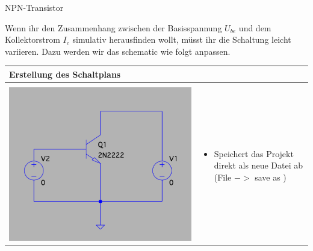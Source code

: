 \begin{frame}[t]{NPN-Transistor}

  \begin{spacing}{0.6} \begin{tiny}

      Wenn ihr den Zusammenhang zwischen der Basisspannung $U_{be}$ und dem Kollektorstrom $I_c$ simulativ herausfinden wollt, müsst
      ihr die Schaltung leicht variieren. Dazu werden wir das schematic wie folgt anpassen.

    \end{tiny} \end{spacing}
  \begin{spacing}{0.9} \begin{tiny}
      \begin{table}[h!]
        \begin{tabular}{p{3cm} p{7cm}}
          \hline
          \textbf{Erstellung des Schaltplans}   & \\
          \hline                                  \\
          \begin{minipage}{.3\textwidth}
            \includegraphics[width=\linewidth]{pictures/tran2.png}
          \end{minipage}
                                                &
          \begin{minipage}{.7\textwidth}
            \begin{itemize}
              \item Speichert das Projekt direkt als neue Datei ab (File $->$ save as )

\end{itemize}
\end{minipage}
\end{tabular}
\end{table}
\end{tiny}
\end{spacing}
\end{frame}
